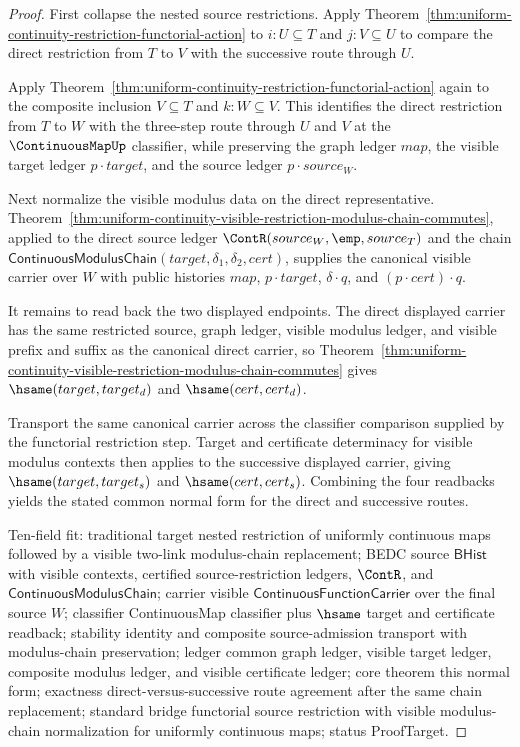 \begin{proof}
First collapse the nested source restrictions. Apply Theorem~\ref{thm:uniform-continuity-restriction-functorial-action} to $i:U\subseteq T$ and $j:V\subseteq U$ to compare the direct restriction from $T$ to $V$ with the successive route through $U$.

Apply Theorem~\ref{thm:uniform-continuity-restriction-functorial-action} again to the composite inclusion $V\subseteq T$ and $k:W\subseteq V$. This identifies the direct restriction from $T$ to $W$ with the three-step route through $U$ and $V$ at the $\ContinuousMapUp$ classifier, while preserving the graph ledger $map$, the visible target ledger $p\cdot target$, and the source ledger $p\cdot source_W$.

Next normalize the visible modulus data on the direct representative. Theorem~\ref{thm:uniform-continuity-visible-restriction-modulus-chain-commutes}, applied to the direct source ledger $\ContR(source_W,\emp,source_T)$ and the chain $\mathsf{ContinuousModulusChain}(target,\delta_1,\delta_2,cert)$, supplies the canonical visible carrier over $W$ with public histories $map$, $p\cdot target$, $\delta\cdot q$, and $(p\cdot cert)\cdot q$.

It remains to read back the two displayed endpoints. The direct displayed carrier has the same restricted source, graph ledger, visible modulus ledger, and visible prefix and suffix as the canonical direct carrier, so Theorem~\ref{thm:uniform-continuity-visible-restriction-modulus-chain-commutes} gives $\hsame(target,target_d)$ and $\hsame(cert,cert_d)$.

Transport the same canonical carrier across the classifier comparison supplied by the functorial restriction step. Target and certificate determinacy for visible modulus contexts then applies to the successive displayed carrier, giving $\hsame(target,target_s)$ and $\hsame(cert,cert_s)$. Combining the four readbacks yields the stated common normal form for the direct and successive routes.

Ten-field fit: traditional target nested restriction of uniformly continuous maps followed by a visible two-link modulus-chain replacement; BEDC source $\mathsf{BHist}$ with visible contexts, certified source-restriction ledgers, $\ContR$, and $\mathsf{ContinuousModulusChain}$; carrier visible $\mathsf{ContinuousFunctionCarrier}$ over the final source $W$; classifier ContinuousMap classifier plus $\hsame$ target and certificate readback; stability identity and composite source-admission transport with modulus-chain preservation; ledger common graph ledger, visible target ledger, composite modulus ledger, and visible certificate ledger; core theorem this normal form; exactness direct-versus-successive route agreement after the same chain replacement; standard bridge functorial source restriction with visible modulus-chain normalization for uniformly continuous maps; status ProofTarget.
\end{proof}
